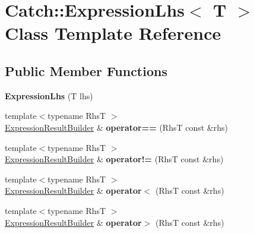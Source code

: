 \hypertarget{classCatch_1_1ExpressionLhs}{}\section{Catch\+:\+:Expression\+Lhs$<$ T $>$ Class Template Reference}
\label{classCatch_1_1ExpressionLhs}
\subsection*{Public Member Functions}
\begin{DoxyCompactItemize}
\item 
{\bfseries Expression\+Lhs} (T lhs)\hypertarget{classCatch_1_1ExpressionLhs_a22d67f6de8fd701f82ca0c91fc3a381d}{}\label{classCatch_1_1ExpressionLhs_a22d67f6de8fd701f82ca0c91fc3a381d}

\item 
{\footnotesize template$<$typename RhsT $>$ }\\\hyperlink{classCatch_1_1ExpressionResultBuilder}{Expression\+Result\+Builder} \& {\bfseries operator==} (RhsT const \&rhs)\hypertarget{classCatch_1_1ExpressionLhs_ad6247606e88d1d188b0736d07c7cfc1a}{}\label{classCatch_1_1ExpressionLhs_ad6247606e88d1d188b0736d07c7cfc1a}

\item 
{\footnotesize template$<$typename RhsT $>$ }\\\hyperlink{classCatch_1_1ExpressionResultBuilder}{Expression\+Result\+Builder} \& {\bfseries operator!=} (RhsT const \&rhs)\hypertarget{classCatch_1_1ExpressionLhs_a27dc38036186c11f7c197ea3ebb20530}{}\label{classCatch_1_1ExpressionLhs_a27dc38036186c11f7c197ea3ebb20530}

\item 
{\footnotesize template$<$typename RhsT $>$ }\\\hyperlink{classCatch_1_1ExpressionResultBuilder}{Expression\+Result\+Builder} \& {\bfseries operator$<$} (RhsT const \&rhs)\hypertarget{classCatch_1_1ExpressionLhs_aff8d8124d948895897c4f2d52d39d8df}{}\label{classCatch_1_1ExpressionLhs_aff8d8124d948895897c4f2d52d39d8df}

\item 
{\footnotesize template$<$typename RhsT $>$ }\\\hyperlink{classCatch_1_1ExpressionResultBuilder}{Expression\+Result\+Builder} \& {\bfseries operator$>$} (RhsT const \&rhs)\hypertarget{classCatch_1_1ExpressionLhs_a831eaabf3e182c8f36eede97182e513d}{}\label{classCatch_1_1ExpressionLhs_a831eaabf3e182c8f36eede97182e513d}


\end{DoxyCompactItemize}
